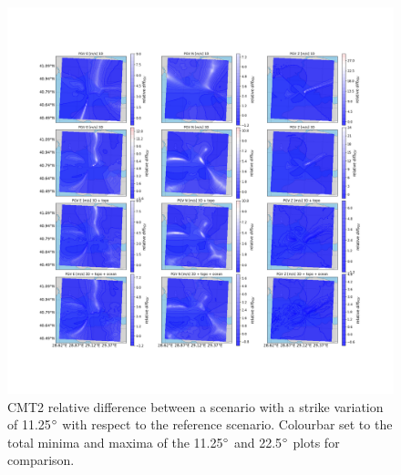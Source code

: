 \documentclass[../Text/00main.tex]{subfiles}
\begin{document}
\begin{figure}[!htp]
    \centering
    \includegraphics[width=1\linewidth ,trim = 2cm 5cm 1cm 5cm, clip]{images_results/strike_variation_epsilon12_sc2.png}
    \caption{CMT2 relative difference between a scenario with a strike variation of 11.25$\degree$ with respect to the reference scenario. Colourbar set to the total minima and maxima of the 11.25$\degree$ and 22.5$\degree$ plots for comparison.}
    \label{fig:ref_eps12-2}
\end{figure}
\end{document}
